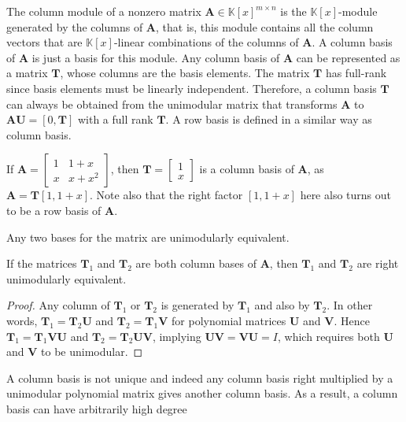 The column module of a nonzero matrix $\mathbf{A}\in\mathbb{K}\left[x\right]^{m\times n}$
is the $\mathbb{K}\left[x\right]$-module generated by the columns
of $\mathbf{A}$, that is, this module contains all the column vectors
that are $\mathbb{K}\left[x\right]$-linear combinations of the columns
of $\mathbf{A}$. A column basis of $\mathbf{A}$ is just a basis
for this module. Any column basis of $\mathbf{A}$ can be represented
as a matrix $\mathbf{T}$, whose columns are the basis elements. The
matrix $\mathbf{T}$ has full-rank since basis elements must be linearly
independent. Therefore, a column basis $\mathbf{T}$ can always be
obtained from the unimodular matrix that transforms $\mathbf{A}$
to $\mathbf{A}\mathbf{U}=\left[0,\mathbf{T}\right]$ with a full rank
$\mathbf{T}$. A row basis is defined in a similar way as column basis.
\begin{example}
If $\mathbf{A}=\begin{bmatrix}1 & 1+x\\
x & x+x^{2}
\end{bmatrix}$, then $\mathbf{T}=\begin{bmatrix}1\\
x
\end{bmatrix}$ is a column basis of $\mathbf{A}$, as $\mathbf{A}=\mathbf{T}\left[1,1+x\right]$.
Note also that the right factor $\left[1,1+x\right]$ here also turns
out to be a row basis of $\mathbf{A}$.
\end{example}
Any two bases for the matrix are unimodularly equivalent.
\begin{lem}
\label{lem:basisEquivalence}If the matrices $\mathbf{T}_{1}$ and
$\mathbf{T}_{2}$ are both column bases of $\mathbf{A}$, then $\mathbf{T}_{1}$
and $\mathbf{T}_{2}$ are right unimodularly equivalent.\end{lem}
\begin{proof}
Any column of $\mathbf{T}_{1}$ or $\mathbf{T}_{2}$ is generated
by $\mathbf{T}_{1}$ and also by $\mathbf{T}_{2}$. In other words,
$\mathbf{T}_{1}=\mathbf{T}_{2}\mathbf{U}$ and $\mathbf{T}_{2}=\mathbf{T}_{1}\mathbf{V}$
for polynomial matrices $\mathbf{U}$ and $\mathbf{V}$. Hence $\mathbf{T}_{1}=\mathbf{T}_{1}\mathbf{V}\mathbf{U}$
and $\mathbf{T}_{2}=\mathbf{T}_{2}\mathbf{U}\mathbf{V}$, implying
$\mathbf{U}\mathbf{V}=\mathbf{V}\mathbf{U}=I$, which requires both
$\mathbf{U}$ and $\mathbf{V}$ to be unimodular.
\end{proof}
\noindent A column basis is not unique and indeed any column basis
right multiplied by a unimodular polynomial matrix gives another column
basis. As a result, a column basis can have arbitrarily high degree


